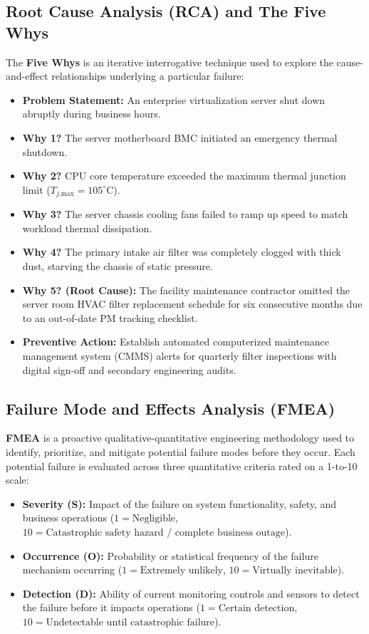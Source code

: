 \subsection{Root Cause Analysis (RCA) and The Five Whys}
The \textbf{Five Whys} is an iterative interrogative technique used to explore the cause-and-effect relationships underlying a particular failure:
\begin{itemize}[leftmargin=*]
    \item \textbf{Problem Statement:} An enterprise virtualization server shut down abruptly during business hours.
    \item \textbf{Why 1?} The server motherboard BMC initiated an emergency thermal shutdown.
    \item \textbf{Why 2?} CPU core temperature exceeded the maximum thermal junction limit ($T_{j\text{,max}} = 105^\circ\text{C}$).
    \item \textbf{Why 3?} The server chassis cooling fans failed to ramp up speed to match workload thermal dissipation.
    \item \textbf{Why 4?} The primary intake air filter was completely clogged with thick dust, starving the chassis of static pressure.
    \item \textbf{Why 5? (Root Cause):} The facility maintenance contractor omitted the server room HVAC filter replacement schedule for six consecutive months due to an out-of-date PM tracking checklist.
    \item \textbf{Preventive Action:} Establish automated computerized maintenance management system (CMMS) alerts for quarterly filter inspections with digital sign-off and secondary engineering audits.
\end{itemize}

\subsection{Failure Mode and Effects Analysis (FMEA)}
\textbf{FMEA} is a proactive qualitative-quantitative engineering methodology used to identify, prioritize, and mitigate potential failure modes before they occur. Each potential failure is evaluated across three quantitative criteria rated on a 1-to-10 scale:
\begin{itemize}[leftmargin=*]
    \item \textbf{Severity (S):} Impact of the failure on system functionality, safety, and business operations ($1 = \text{Negligible}$, $10 = \text{Catastrophic safety hazard / complete business outage}$).
    \item \textbf{Occurrence (O):} Probability or statistical frequency of the failure mechanism occurring ($1 = \text{Extremely unlikely}$, $10 = \text{Virtually inevitable}$).
    \item \textbf{Detection (D):} Ability of current monitoring controls and sensors to detect the failure before it impacts operations ($1 = \text{Certain detection}$, $10 = \text{Undetectable until catastrophic failure}$).
\end{itemize}

